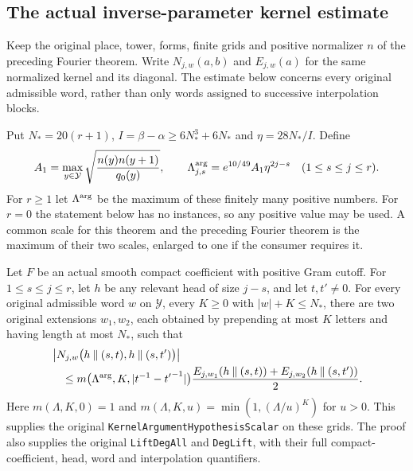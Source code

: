 \subsection{The actual inverse-parameter kernel estimate}
\label{actual-off-diagonal}

Keep the original place, tower, forms, finite grids and positive
normalizer $n$ of the preceding Fourier theorem.  Write
$N_{j,w}(a,b)$ and $E_{j,w}(a)$ for the same normalized
kernel and its diagonal.  The estimate below concerns every
original admissible word, rather than only words assigned to
successive interpolation blocks.

Put $N_*=20(r+1)$, $I=\beta-\alpha\ge6N_*^3+6N_*$ and
$\eta=28N_*/I$.  Define
\[
 A_1=\max_{y\in\mathcal Y}
       \sqrt{\frac{n(y)n(y+1)}{q_0(y)}},\qquad
 \Lambda_{j,s}^{\rm arg}=e^{10/49}A_1\eta^{2j-s}
       \quad(1\le s\le j\le r).
\]
For $r\ge1$ let $\Lambda^{\rm arg}$ be the maximum of
these finitely many positive numbers.  For $r=0$ the
statement below has no instances, so any positive value
may be used.  A common scale for this theorem and the
preceding Fourier theorem is the maximum of their two
scales, enlarged to one if the consumer requires it.

\begin{theorem}\label{off-diagonal-actual}
Let $F$ be an actual smooth compact coefficient with positive
Gram cutoff.  For $1\le s\le j\le r$, let $h$ be any
relevant head of size $j-s$, and let $t,t'\ne0$.
For every original admissible word $w$ on $\mathcal Y$,
every $K\ge0$ with $|w|+K\le N_*$, there are two original
extensions $w_1,w_2$, each obtained by prepending at most
$K$ letters and having length at most $N_*$, such that
\begin{align}\label{off-diagonal-bound}
 &\left|N_{j,w}\bigl(h\mathbin{\|}(s,t),
                           h\mathbin{\|}(s,t')\bigr)\right|\notag\\
 &\quad\le
 m\bigl(\Lambda^{\rm arg},K,|t^{-1}-{t'}^{-1}|\bigr)
 \frac{E_{j,w_1}(h\mathbin{\|}(s,t))+
       E_{j,w_2}(h\mathbin{\|}(s,t'))}{2}.
\end{align}
Here $m(\Lambda,K,0)=1$ and
$m(\Lambda,K,u)=\min(1,(\Lambda/u)^K)$ for $u>0$.
This supplies the original
\texttt{KernelArgumentHypothesisScalar} on these grids.
The proof also supplies the original \texttt{LiftDegAll}
and \texttt{DegLift}, with their full compact-coefficient,
head, word and interpolation quantifiers.
\end{theorem}


